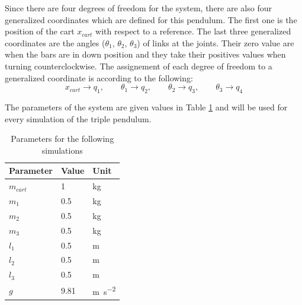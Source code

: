 \documentclass[a4paper,12pt,twoside]{article}
\begin{document}
Since there are four degrees of freedom for the system, there are also four generalized coordinates which are defined for this pendulum. The first one is the position of the cart $x_{cart}$ with respect to a reference. The last three generalized coordinates are the angles ($\theta_1$, $\theta_2$, $\theta_3$) of links at the joints. Their zero value are when the bars are in down position and they take their positives values when turning counterclockwise. The assignement of each degree of freedom to a generalized coordinate is according to the following:
\[
	x_{cart}\to q_1, \qquad \theta_1\to q_2, \qquad \theta_2\to q_3, \qquad \theta_3\to q_4
\]

The parameters of the system are given values in Table \ref{tab:parameters_system} and will be used for every simulation of the triple pendulum.
\begin{table}[H]
	\centering
	\caption{Parameters for the following simulations}
	\label{tab:parameters_system}
	\begin{tabular}{@{}lll@{}}
		\toprule
		Parameter  & Value & Unit                     \\ \midrule
		$m_{cart}$ & 1     & kg                       \\
		$m_1$      & 0.5   & kg                       \\
		$m_2$      & 0.5   & kg                       \\
		$m_3$      & 0.5   & kg                       \\
		$l_1$      & 0.5   & m                        \\
		$l_2$      & 0.5   & m                        \\
		$l_3$      & 0.5   & m                        \\
		$g$        & 9.81  & \si{m\per\square\second} \\ \bottomrule
	\end{tabular}
\end{table}
\end{document}

